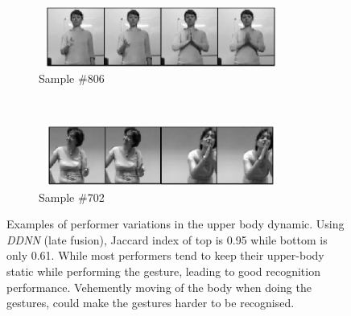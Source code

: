 \begin{figure}[t]
        \centering
        \begin{subfigure}[c]{.5\textwidth}
        \centering
                \includegraphics[width=8cm,height=2cm, clip]{images/original806.png}
                \caption{\small{Sample \#806}}
        \end{subfigure}%
        \\
        \begin{subfigure}[c]{0.5\textwidth}
        \centering
                \includegraphics[width=8cm,height=2cm, clip]{images/original702.png}
                \caption{\small{Sample \#702}}
        \end{subfigure}

  \caption{
\small{Examples of performer variations in the  upper body dynamic.
Using \emph{DDNN} (late fusion), Jaccard index of top is 0.95 while bottom is only 0.61.
While most performers tend to keep their upper-body static while performing the gesture, leading to good recognition performance. Vehemently moving of the body when doing the gestures, could make the gestures harder to be recognised.}
  }
\label{fig:bodydynamics}
\end{figure}



